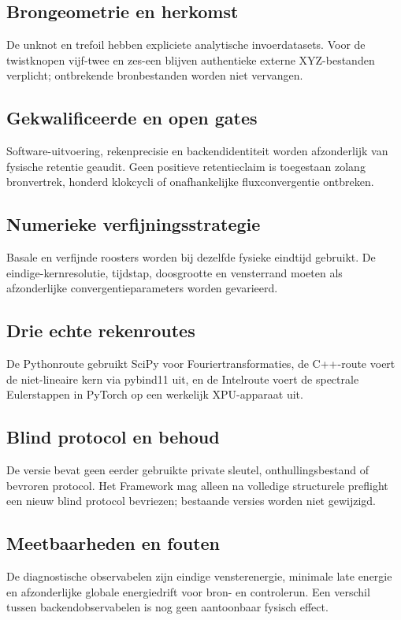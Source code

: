\documentclass[10pt,a4paper]{article}
\begin{document}
\subsection{Brongeometrie en herkomst}
De unknot en trefoil hebben expliciete analytische invoerdatasets. Voor de twistknopen vijf-twee en zes-een blijven authentieke externe XYZ-bestanden verplicht; ontbrekende bronbestanden worden niet vervangen.
\subsection{Gekwalificeerde en open gates}
Software-uitvoering, rekenprecisie en backendidentiteit worden afzonderlijk van fysische retentie geaudit. Geen positieve retentieclaim is toegestaan zolang bronvertrek, honderd klokcycli of onafhankelijke fluxconvergentie ontbreken.
\subsection{Numerieke verfijningsstrategie}
Basale en verfijnde roosters worden bij dezelfde fysieke eindtijd gebruikt. De eindige-kernresolutie, tijdstap, doosgrootte en vensterrand moeten als afzonderlijke convergentieparameters worden gevarieerd.
\subsection{Drie echte rekenroutes}
De Pythonroute gebruikt SciPy voor Fouriertransformaties, de C++-route voert de niet-lineaire kern via pybind11 uit, en de Intelroute voert de spectrale Eulerstappen in PyTorch op een werkelijk XPU-apparaat uit.
\subsection{Blind protocol en behoud}
De versie bevat geen eerder gebruikte private sleutel, onthullingsbestand of bevroren protocol. Het Framework mag alleen na volledige structurele preflight een nieuw blind protocol bevriezen; bestaande versies worden niet gewijzigd.
\subsection{Meetbaarheden en fouten}
De diagnostische observabelen zijn eindige vensterenergie, minimale late energie en afzonderlijke globale energiedrift voor bron- en controlerun. Een verschil tussen backendobservabelen is nog geen aantoonbaar fysisch effect.
\end{document}
